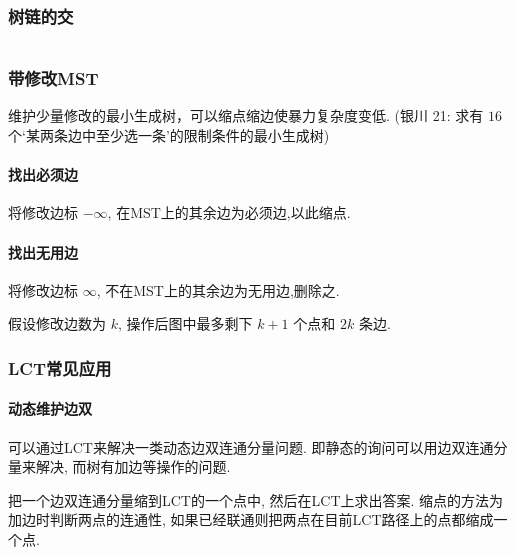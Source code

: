 \subsubsection{树链的交}
	\inputminted{cpp}{src/yzh/path_inter.cpp}

\subsubsection{带修改MST}
    维护少量修改的最小生成树，可以缩点缩边使暴力复杂度变低. (银川 21: 求有 $16$ 个`某两条边中至少选一条'的限制条件的最小生成树) 
    \paragraph{找出必须边}将修改边标 $-\infty$, 在MST上的其余边为必须边,以此缩点.
    \paragraph{找出无用边}将修改边标 $\infty$, 不在MST上的其余边为无用边,删除之. 

    假设修改边数为 $k$, 操作后图中最多剩下 $k+1$ 个点和 $2k$ 条边.
    
\subsubsection{LCT常见应用}
	\paragraph{动态维护边双}
		可以通过LCT来解决一类动态边双连通分量问题. 即静态的询问可以用边双连通分量来解决, 而树有加边等操作的问题. 
		\par 把一个边双连通分量缩到LCT的一个点中, 然后在LCT上求出答案. 缩点的方法为加边时判断两点的连通性, 如果已经联通则把两点在目前LCT路径上的点都缩成一个点. 

